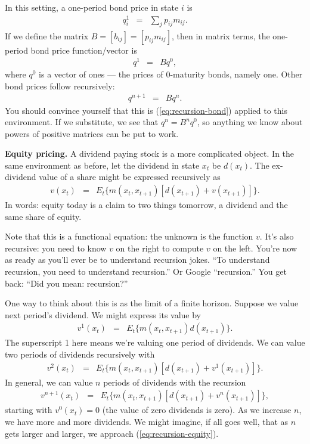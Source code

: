 \documentclass[11pt]{article}
\begin{document}
In this setting, a one-period bond price in state $i$ is
\begin{eqnarray*}
    q^1_i &=& \sum_j p_{ij} m_{ij} .
\end{eqnarray*}
If we define the matrix $B = [b_{ij}] = [p_{ij} m_{ij}]$,
then in matrix terms, the one-period bond price function/vector is
\begin{eqnarray*}
    q^1 &=& B q^0 ,
\end{eqnarray*}
where $q^0$ is a vector of ones ---    
the prices of 0-maturity bonds, namely one.  
 Other bond prices follow recursively:
\begin{eqnarray*}
    q^{n+1} &=& B q^n .
\end{eqnarray*}
You should convince yourself that this is (\ref{eq:recursion-bond}) 
applied to this environment.  
If we substitute, we see that $q^n = B^n q^0 $, so anything we know
about powers of positive matrices can be put to work.

{\bf Equity pricing.\/}
A dividend paying stock is a more complicated object.
In the same environment as before, let the dividend in state $x_t$ be $d(x_t)$.
The ex-dividend value of a share might be expressed recursively as
\begin{eqnarray}
    v(x_t) &=& E_t \big\{ m(x_t,x_{t+1}) [d(x_{t+1}) + v(x_{t+1})] \big\} .
    \label{eq:recursion-equity}
\end{eqnarray}
In words:  equity today is a claim to two things tomorrow, 
a dividend and the same share of equity.  

Note that this is a functional equation:  the unknown is the function $v$. 
It's also recursive:  you need to know $v$ on the right to compute $v$ on the left.
You're now as ready as you'll ever be to understand recursion jokes.
``To understand recursion, you need to understand recursion.''
Or Google ``recursion.'' You get back:  ``Did you mean: recursion?''

One way to think about this is as the limit of a finite horizon.  
Suppose we value next period's dividend.  We might express its value by 
\begin{eqnarray*}
    v^1(x_t) &=& E_t \big\{ m(x_t,x_{t+1}) d(x_{t+1}) \big\} .
\end{eqnarray*}
The superscript 1 here means we're valuing one period of dividends. 
We can value two periods of dividends recursively with 
\begin{eqnarray*}
    v^2(x_t) &=& E_t \big\{ m(x_t,x_{t+1}) [d(x_{t+1}) + v^1(x_{t+1})] \big\} .
\end{eqnarray*}
In general, we can value $n$ periods of dividends with the recursion
\begin{eqnarray*}
    v^{n+1}(x_t) &=& E_t \big\{ m(x_t,x_{t+1}) [d(x_{t+1}) + v^n(x_{t+1})] \big\} ,
\end{eqnarray*}
starting with $v^0(x_t) = 0$ (the value of zero dividends is zero).  
As we increase $n$, we have more and more dividends.
We might imagine, if all goes well, that as $n$ gets larger and larger, 
we approach (\ref{eq:recursion-equity}).
\end{document}
